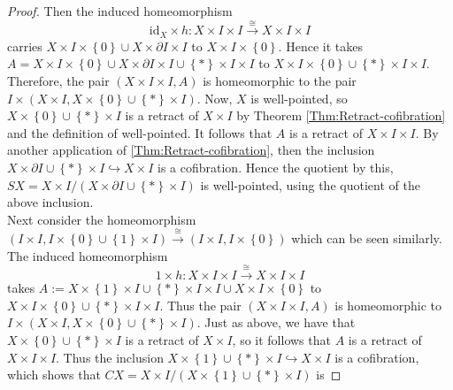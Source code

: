 \documentclass[reqno]{amsart}
\theoremstyle{definition}
\theoremstyle{remark}
\newcommand{\id}{{\mathrm{id}}}
\begin{document}
\begin{proof}
    Then the induced homeomorphism
    \[
    \id_X \times h\colon X \times I \times I 
    \stackrel{\cong}{\to} X \times I \times I
    \] 
    carries 
    $X \times I \times \left\{ 0 \right\} \cup 
    X \times \partial I\times I$ to
    $X \times I \times \left\{ 0 \right\} $.
    Hence it takes
    $A = X \times I \times \left\{ 0 \right\} \cup 
    X \times \partial I \times I \cup 
    \left\{ * \right\} \times I \times I$ to
    $X \times I \times \left\{ 0 \right\} 
    \cup \left\{ * \right\} \times I \times I$. 
    Therefore, the pair
    $\left( X \times I \times I, A \right) $ is homeomorphic
    to the pair
    $I \times \left( X \times I, 
    X \times \left\{ 0 \right\} \cup 
\left\{ * \right\} \times I \right) $.
Now, $X$ is well-pointed, so
$X \times \left\{ 0 \right\} \cup 
\left\{ * \right\} \times I$ is a retract of
$X \times I$ by
Theorem \ref{Thm:Retract-cofibration} and the
definition of well-pointed.
It follows that
$A$ is a retract of
$X \times I \times I$.
By another application of
\ref{Thm:Retract-cofibration}, then
the inclusion
$X \times \partial I \cup \left\{ * \right\} \times I
\hookrightarrow X \times I$ is a cofibration. 
Hence the quotient by this,
$SX = X \times I / \left( X \times \partial I
\cup \left\{ * \right\} \times I \right) $ is well-pointed,
using the quotient of the above inclusion.\\
\linebreak
Next consider the homeomorphism
$\left( I \times I, I \times \left\{ 0 \right\} \cup 
\left\{ 1 \right\} \times I \right) 
\stackrel{\cong}{\to} \left( 
I \times I, I \times \left\{ 0 \right\} \right) $ which
can be seen similarly. The induced
homeomorphism
\[
1 \times h \colon X \times I \times I
\stackrel{\cong}{\to} X \times I \times I
\] 
takes
$A:= X \times \left\{ 1 \right\} \times I \cup 
\left\{ * \right\} \times I \times I
\cup X \times I \times \left\{ 0 \right\} $ to
$X \times I \times \left\{ 0 \right\} \cup 
\left\{ * \right\} \times I \times I$.
Thus the pair
$\left( X \times I \times I,
A\right) $ is homeomorphic to
 $I \times \left( X \times I,
 X \times \left\{ 0 \right\} \cup 
\left\{ * \right\} \times I\right) $.
Just as above, we have that
$X \times \left\{ 0 \right\} \cup 
\left\{ * \right\} \times I$ is a retract
of $X \times I$, so
it follows that
$A$ is a retract of $X \times I \times I$. Thus
the inclusion
$X \times \left\{ 1 \right\} \cup 
\left\{ * \right\} \times I \hookrightarrow
X \times I$ is a cofibration, which shows
that $CX = X \times I / \left( X \times \left\{ 1 \right\} 
\cup \left\{ * \right\} \times I\right) $ is

\end{proof}
\end{document}
